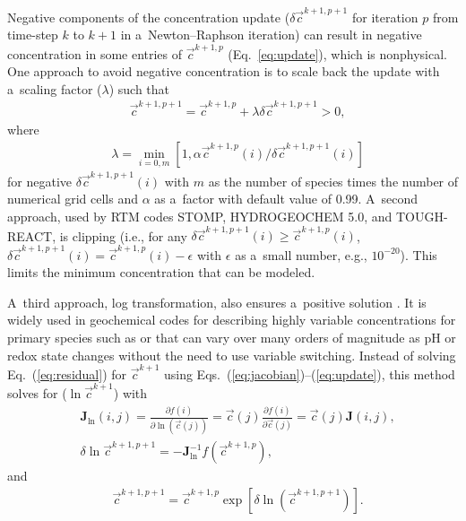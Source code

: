 \documentclass[gmd,noline]{copernicus}
\begin{document}
      Negative components of the concentration update ($\delta
      \vec{c}^{k+1,p+1}$ for iteration $p$ from time-step $k$ to $k+1$ in
      a~Newton--Raphson iteration) can result in negative concentration in
      some entries of $\vec{c}^{k+1,p}$ (Eq.~\ref{eq:update}), which is
      nonphysical. One approach to avoid negative concentration is to scale
      back the update with a~scaling factor ($\lambda$)
      \citep{Bethke2007,Hammond2003} such that
\begin{align}
 &
\vec{c}^{k+1,p+1}=\vec{c}^{k+1,p}+\lambda \delta \vec{c}^{k+1,p+1} > 0,
\label{eq:lambda}
\end{align}%
      where
\begin{align}
 &
\lambda = \min_{i=0,m} [1, \alpha {\vec{c}^{k+1,p}(i)}/{\delta \vec{c}^{k+1,p+1} (i)}]
\label{eq:alpha}
\end{align}%
      for negative $\delta \vec{c}^{k+1,p+1} (i)$ with $m$ as the number of
      species times the number of numerical grid cells and $\alpha$ as
      a~factor with default value of 0.99. A~second approach, used by RTM
      codes STOMP, HYDROGEOCHEM 5.0, and TOUGH-REACT, is clipping (i.e., for
      any $\delta \vec{c}^{k+1,p+1}(i) \geq \vec{c}^{k+1,p}(i)$, $\delta
      \vec{c}^{k+1,p+1}(i) = \vec{c}^{k+1,p}(i) - \epsilon$ with $\epsilon$ as
      a~small number, e.g., $10^{-20}$). This limits the minimum
      concentration that can be modeled.

      A~third approach, log transformation, also ensures a~positive solution
      \citep{Bethke2007,Hammond2003,Parkhurst1999}. It is widely used in
      geochemical codes for describing highly variable concentrations for
      primary species such as  or  that can vary over
      many orders of magnitude as pH or redox state changes without the need
      to use variable switching. Instead of solving Eq.~(\ref{eq:residual})
      for $\vec{c}^{k+1}$ using Eqs.~(\ref{eq:jacobian})--(\ref{eq:update}),
      this method solves for ($\ln\vec{c}^{k+1}$) \citep{Hammond2003} with
\begin{align}
 &
\mathbf{J}_{\ln}(i, j) =
\frac{\partial {f}(i)}{\partial \ln(\vec{c}(j))} = \vec{c}(j) \frac{\partial {f}(i)}{\partial \vec{c}(j)} = \vec{c}(j) \mathbf{J}(i, j),
\label{eq:jacobianlt}\\
&
\delta \ln\vec{c}^{k+1,p+1}= -\mathbf{J}^{-1}_{\ln} {f} (\vec{c}^{k+1,p}),
\label{eq:axblt}
\end{align}%
      and
\begin{align}
 &
\vec{c}^{k+1,p+1}=\vec{c}^{k+1,p}\exp [\delta \ln(\vec{c}^{k+1,p+1})].
\label{eq:updatelt}
\end{align}%
\end{document}
